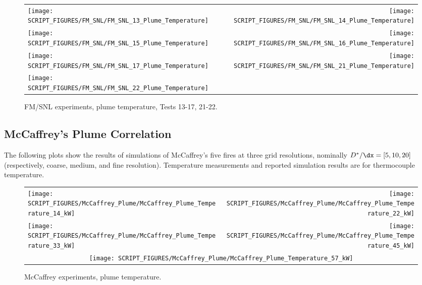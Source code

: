 \begin{figure}[p]
\begin{tabular*}{\textwidth}{l@{\extracolsep{\fill}}r}
\texttt{[image: SCRIPT\_FIGURES/FM\_SNL/FM\_SNL\_13\_Plume\_Temperature]} &
\texttt{[image: SCRIPT\_FIGURES/FM\_SNL/FM\_SNL\_14\_Plume\_Temperature]} \\
\texttt{[image: SCRIPT\_FIGURES/FM\_SNL/FM\_SNL\_15\_Plume\_Temperature]} &
\texttt{[image: SCRIPT\_FIGURES/FM\_SNL/FM\_SNL\_16\_Plume\_Temperature]} \\
\texttt{[image: SCRIPT\_FIGURES/FM\_SNL/FM\_SNL\_17\_Plume\_Temperature]} &
\texttt{[image: SCRIPT\_FIGURES/FM\_SNL/FM\_SNL\_21\_Plume\_Temperature]} \\
\texttt{[image: SCRIPT\_FIGURES/FM\_SNL/FM\_SNL\_22\_Plume\_Temperature]} &
\end{tabular*}
\caption[FM/SNL experiments, plume temperature, Tests 13-17, 21-22]
{FM/SNL experiments, plume temperature, Tests 13-17, 21-22.}
\label{FM_SNL_Plume_3}
\end{figure}

\clearpage



\subsection{McCaffrey's Plume Correlation}

The following plots show the results of simulations of McCaffrey's five fires at three grid resolutions, nominally $D^*/\dx=[5,10,20]$ (respectively, coarse, medium, and fine resolution).  Temperature measurements and reported simulation results are for thermocouple temperature.

\begin{figure}[h!]
\begin{tabular*}{\textwidth}{l@{\extracolsep{\fill}}r}
\texttt{[image: SCRIPT\_FIGURES/McCaffrey\_Plume/McCaffrey\_Plume\_Temperature\_14\_kW]} &
\texttt{[image: SCRIPT\_FIGURES/McCaffrey\_Plume/McCaffrey\_Plume\_Temperature\_22\_kW]} \\
\texttt{[image: SCRIPT\_FIGURES/McCaffrey\_Plume/McCaffrey\_Plume\_Temperature\_33\_kW]} &
\texttt{[image: SCRIPT\_FIGURES/McCaffrey\_Plume/McCaffrey\_Plume\_Temperature\_45\_kW]} \\
\multicolumn{2}{c}{\texttt{[image: SCRIPT\_FIGURES/McCaffrey\_Plume/McCaffrey\_Plume\_Temperature\_57\_kW]}}
\end{tabular*}
\caption[McCaffrey experiments, plume temperature]
{McCaffrey experiments, plume temperature.}
\label{McCaffrey_Plume_Temperature}
\end{figure}

